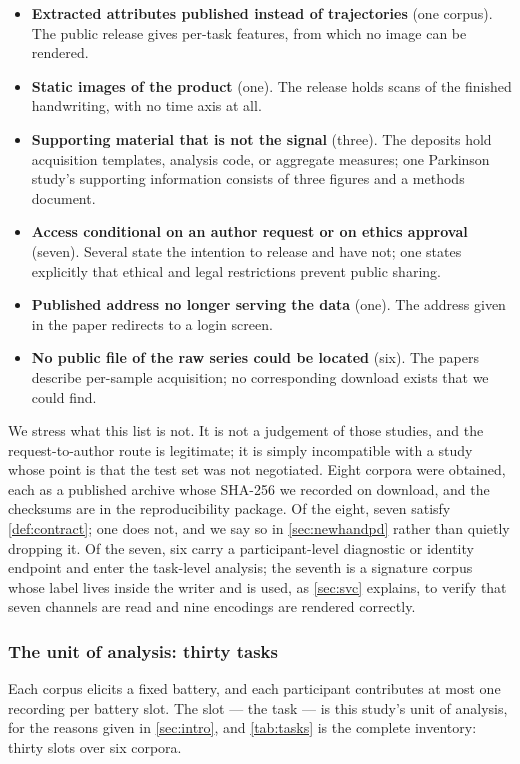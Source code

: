 \begin{itemize}
\itemsep0em
\item \textbf{Extracted attributes published instead of trajectories} (one corpus). The public
release gives per-task features, from which no image can be rendered.
\item \textbf{Static images of the product} (one). The release holds scans of the finished
handwriting, with no time axis at all.
\item \textbf{Supporting material that is not the signal} (three). The deposits hold acquisition
templates, analysis code, or aggregate measures; one Parkinson study's supporting information
consists of three figures and a methods document.
\item \textbf{Access conditional on an author request or on ethics approval} (seven). Several state
the intention to release and have not; one states explicitly that ethical and legal restrictions
prevent public sharing.
\item \textbf{Published address no longer serving the data} (one). The address given in the paper
redirects to a login screen.
\item \textbf{No public file of the raw series could be located} (six). The papers describe
per-sample acquisition; no corresponding download exists that we could find.
\end{itemize}

We stress what this list is not. It is not a judgement of those studies, and the request-to-author
route is legitimate; it is simply incompatible with a study whose point is that the test set was
not negotiated. Eight corpora were obtained, each as a published archive whose SHA-256 we recorded
on download, and the checksums are in the reproducibility package. Of the eight, seven satisfy
\cref{def:contract}; one does not, and we say so in \cref{sec:newhandpd} rather than quietly
dropping it. Of the seven, six carry a participant-level diagnostic or identity endpoint and enter
the task-level analysis; the seventh is a signature corpus whose label lives inside the writer and
is used, as \cref{sec:svc} explains, to verify that seven channels are read and nine encodings are
rendered correctly.

\subsubsection{The unit of analysis: thirty tasks}
\label{sec:tasks}

Each corpus elicits a fixed battery, and each participant contributes at most one recording per
battery slot. The slot --- the task --- is this study's unit of analysis, for the reasons given in
\cref{sec:intro}, and \cref{tab:tasks} is the complete inventory: thirty slots over six corpora.

